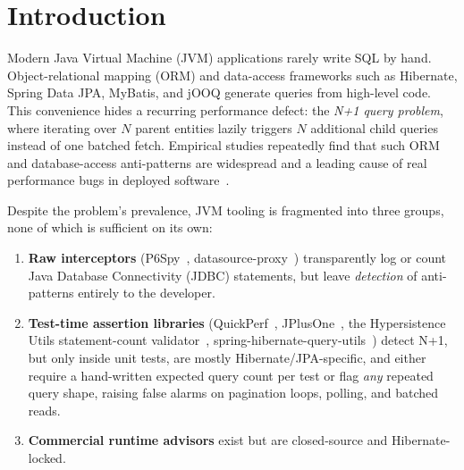 \documentclass[sigplan,screen]{acmart}
\begin{document}
\section{Introduction}
Modern Java Virtual Machine (JVM) applications rarely write SQL by hand. Object-relational mapping
(ORM) and data-access frameworks such as Hibernate, Spring Data JPA, MyBatis,
and jOOQ generate queries from high-level code. This convenience hides a recurring
performance defect: the \emph{N+1 query problem}, where iterating over $N$
parent entities lazily triggers $N$ additional child queries instead of one
batched fetch. Empirical studies repeatedly find that such ORM and
database-access anti-patterns are widespread and a leading cause of real
performance bugs in deployed software~\cite{chen2014orm, yang2018webapps,
yang2019powerstation}.

Despite the problem's prevalence, JVM tooling is fragmented into three groups,
none of which is sufficient on its own:
\begin{enumerate}[leftmargin=*,topsep=2pt,itemsep=1pt]
\item \textbf{Raw interceptors} (P6Spy~\cite{p6spy},
datasource-proxy~\cite{datasourceproxy}) transparently log or count Java
Database Connectivity (JDBC) statements, but leave \emph{detection} of
anti-patterns entirely to the
developer.
\item \textbf{Test-time assertion libraries} (QuickPerf~\cite{quickperf},
JPlusOne~\cite{jplusone}, the Hypersistence Utils statement-count
validator~\cite{hypersistenceutils},
spring-hibernate-query-utils~\cite{springhibernatequeryutils}) detect N+1, but
only inside unit tests, are mostly Hibernate/JPA-specific, and either require a
hand-written expected query count per test or flag \emph{any} repeated query
shape, raising false alarms on pagination loops, polling, and batched reads.
\item \textbf{Commercial runtime advisors} exist but are closed-source and
Hibernate-locked.
\end{enumerate}
\end{document}
